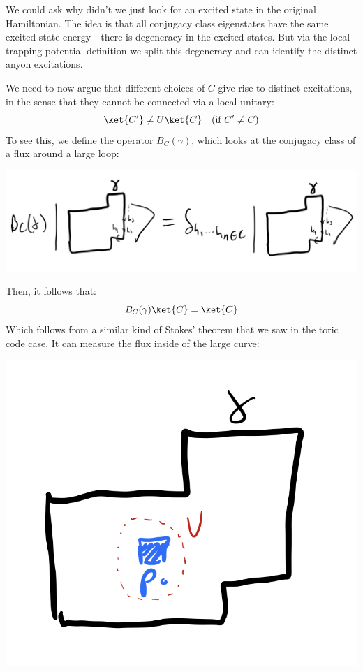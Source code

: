We could ask why didn't we just look for an excited state in the original Hamiltonian. The idea is that all conjugacy class eigenstates have the same excited state energy - there is degeneracy in the excited states. But via the local trapping potential definition we split this degeneracy and can identify the distinct anyon excitations.

We need to now argue that different choices of $C$ give rise to distinct excitations, in the sense that they cannot be connected via a local unitary:
\begin{equation}
    \ket{C'} \neq U\ket{C} \quad (\text{if $C' \neq C$})
\end{equation}
To see this, we define the operator $B_C(\gamma)$, which looks at the conjugacy class of a flux around a large loop:

\begin{center}
    \includegraphics[scale=0.35]{Lectures/Images/lec8-Bcgamma.png}
\end{center}

Then, it follows that:
\begin{equation}
    B_C(\gamma)\ket{C} = \ket{C}
\end{equation}
Which follows from a similar kind of Stokes' theorem that we saw in the toric code case. It can measure the flux inside of the large curve:

\begin{center}
    \includegraphics[scale=0.35]{Lectures/Images/lec8-fluxmeasure.png}
\end{center}

